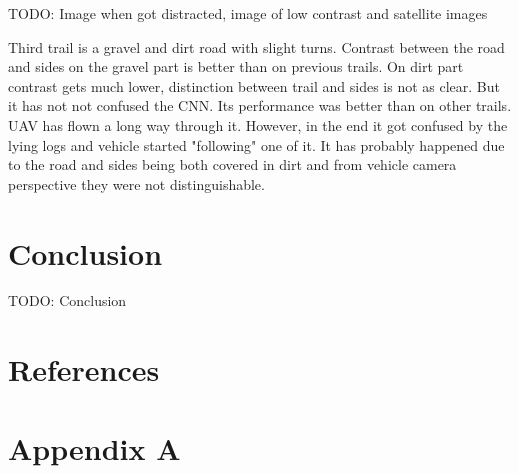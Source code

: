 TODO: Image when got distracted, image of low contrast and satellite images

Third trail is a gravel and dirt road with slight turns. Contrast between the road and sides on the gravel part is better than on previous trails. On dirt part contrast gets much lower, distinction between trail and sides is not as clear. But it has not not confused the CNN. Its performance was better than on other trails. UAV has flown a long way through it. However, in the end it got confused by the lying logs and vehicle started "following" one of it. It has probably happened due to the road and sides being both covered in dirt and from vehicle camera perspective they were not distinguishable.


\chapter{Conclusion}

TODO: Conclusion



\chapter{References}

\printbibliography[heading=none,title={}]


\appendix
\renewcommand\chaptername{Appendix}

\renewcommand{\thechapter}{A}
\renewcommand\chaptername{Appendix A}

\chapter{Appendix A}


